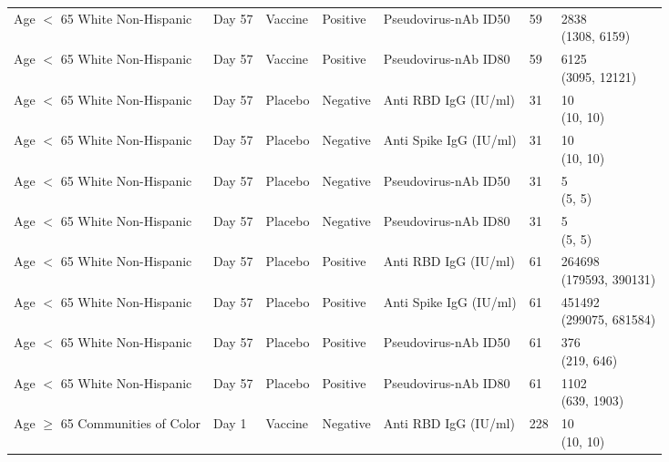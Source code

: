\documentclass[]{book}
\theoremstyle{definition}
\theoremstyle{definition}
\theoremstyle{definition}
\newcommand{\1}{\mathbbm{1}}
\begin{document}
\begin{landscape}
\begin{ThreePartTable}
\begin{longtable}[t]{>{\raggedright\arraybackslash}p{7cm}llllll}
\hspace{1em}Age $<$ 65 White Non-Hispanic & Day 57 & Vaccine & Positive & Pseudovirus-nAb ID50 & 59 & \makecell[l]{2838\\(1308, 6159)}\\
\hspace{1em}Age $<$ 65 White Non-Hispanic & Day 57 & Vaccine & Positive & Pseudovirus-nAb ID80 & 59 & \makecell[l]{6125\\(3095, 12121)}\\
\hspace{1em}Age $<$ 65 White Non-Hispanic & Day 57 & Placebo & Negative & Anti RBD IgG (IU/ml) & 31 & \makecell[l]{10\\(10, 10)}\\
\hspace{1em}Age $<$ 65 White Non-Hispanic & Day 57 & Placebo & Negative & Anti Spike IgG (IU/ml) & 31 & \makecell[l]{10\\(10, 10)}\\
\hspace{1em}Age $<$ 65 White Non-Hispanic & Day 57 & Placebo & Negative & Pseudovirus-nAb ID50 & 31 & \makecell[l]{5\\(5, 5)}\\
\hspace{1em}Age $<$ 65 White Non-Hispanic & Day 57 & Placebo & Negative & Pseudovirus-nAb ID80 & 31 & \makecell[l]{5\\(5, 5)}\\
\hspace{1em}Age $<$ 65 White Non-Hispanic & Day 57 & Placebo & Positive & Anti RBD IgG (IU/ml) & 61 & \makecell[l]{264698\\(179593, 390131)}\\
\hspace{1em}Age $<$ 65 White Non-Hispanic & Day 57 & Placebo & Positive & Anti Spike IgG (IU/ml) & 61 & \makecell[l]{451492\\(299075, 681584)}\\
\hspace{1em}Age $<$ 65 White Non-Hispanic & Day 57 & Placebo & Positive & Pseudovirus-nAb ID50 & 61 & \makecell[l]{376\\(219, 646)}\\
\hspace{1em}Age $<$ 65 White Non-Hispanic & Day 57 & Placebo & Positive & Pseudovirus-nAb ID80 & 61 & \makecell[l]{1102\\(639, 1903)}\\
\hspace{1em}Age $\geq$ 65 Communities of Color & Day 1 & Vaccine & Negative & Anti RBD IgG (IU/ml) & 228 & \makecell[l]{10\\(10, 10)}\\

\end{longtable}
\end{ThreePartTable}
\end{landscape}
\end{document}
